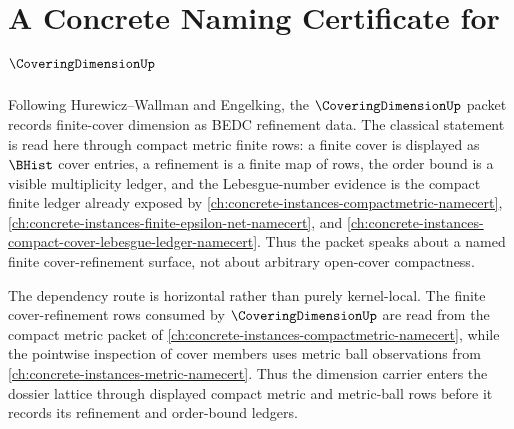 \chapter{A Concrete Naming Certificate for $\CoveringDimensionUp$}
\label{ch:concrete-instances-coveringdimension-namecert}

Following Hurewicz--Wallman and Engelking, the $\CoveringDimensionUp$ packet records finite-cover dimension as BEDC refinement data. The classical statement is read here through compact metric finite rows: a finite cover is displayed as $\BHist$ cover entries, a refinement is a finite map of rows, the order bound is a visible multiplicity ledger, and the Lebesgue-number evidence is the compact finite ledger already exposed by \autoref{ch:concrete-instances-compactmetric-namecert}, \autoref{ch:concrete-instances-finite-epsilon-net-namecert}, and \autoref{ch:concrete-instances-compact-cover-lebesgue-ledger-namecert}. Thus the packet speaks about a named finite cover-refinement surface, not about arbitrary open-cover compactness.

The dependency route is horizontal rather than purely kernel-local. The finite cover-refinement rows consumed by $\CoveringDimensionUp$ are read from the compact metric packet of \autoref{ch:concrete-instances-compactmetric-namecert}, while the pointwise inspection of cover members uses metric ball observations from \autoref{ch:concrete-instances-metric-namecert}. Thus the dimension carrier enters the dossier lattice through displayed compact metric and metric-ball rows before it records its refinement and order-bound ledgers.

